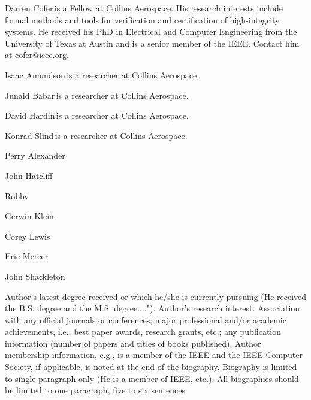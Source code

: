 \begin{IEEEbiography}{Darren Cofer}{\,}is a Fellow at Collins Aerospace. His research interests include formal methods and tools for verification and certification of high-integrity systems. He received his PhD in Electrical and Computer Engineering from the University of Texas at Austin and is a senior member of the IEEE. Contact him at cofer@ieee.org.
\end{IEEEbiography}

\begin{IEEEbiography}{Isaac Amundson}{\,}is a researcher at Collins Aerospace.  
\end{IEEEbiography}

\begin{IEEEbiography}{Junaid Babar}{\,}is a researcher at Collins Aerospace.  
\end{IEEEbiography}

\begin{IEEEbiography}{David Hardin}{\,}is a researcher at Collins Aerospace.  
\end{IEEEbiography}

\begin{IEEEbiography}{Konrad Slind}{\,}is a researcher at Collins Aerospace.  
\end{IEEEbiography}

\begin{IEEEbiography}{Perry Alexander}{\,}  
\end{IEEEbiography}

\begin{IEEEbiography}{John Hatcliff}{\,}  
\end{IEEEbiography}

\begin{IEEEbiography}{Robby}{\,}  
\end{IEEEbiography}

\begin{IEEEbiography}{Gerwin Klein}{\,}  
\end{IEEEbiography}

\begin{IEEEbiography}{Corey Lewis}{\,}  
\end{IEEEbiography}

\begin{IEEEbiography}{Eric Mercer}{\,}  
\end{IEEEbiography}

\begin{IEEEbiography}{John Shackleton}{\,}  
\end{IEEEbiography}

Author's latest degree received or which he/she is currently pursuing (He received the B.S. degree and the M.S. degree...."). Author's research interest. Association with any official journals or conferences; major professional and/or academic achievements, i.e., best paper awards, research grants, etc.; any publication information (number of papers and titles of books published). Author membership information, e.g., is a member of the IEEE and the IEEE Computer Society, if applicable, is noted at the end of the biography. Biography is limited to single paragraph only (He is a member of IEEE, etc.). All biographies should be limited to one paragraph, five to six sentences
